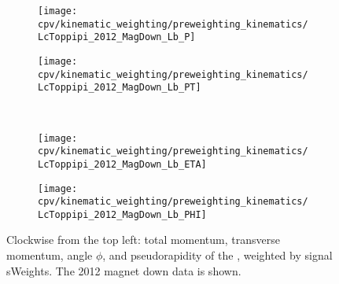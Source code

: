 \begin{sidewaystable}
  \centering
  \caption{%
    Statistics computed on the weighted \ppipi\ data for all data sub-samples 
    used in the analysis.
    The quantities are defined in \cref{chap:cpv:kinematic_weighting:stats}.
  }
  \label{tab:cpv:kinematic_weighting:validation:stats}
  
\end{sidewaystable}

\clearpage

\begin{figure}
  \begin{subfigure}[b]{0.4\textwidth}
    \texttt{[image: cpv/kinematic\_weighting/preweighting\_kinematics/LcToppipi\_2012\_MagDown\_Lb\_P]}
    \label{fig:cpv:kinematic_weighting:pre:Lb:P}
  \end{subfigure}
  \begin{subfigure}[b]{0.4\textwidth}
    \texttt{[image: cpv/kinematic\_weighting/preweighting\_kinematics/LcToppipi\_2012\_MagDown\_Lb\_PT]}
    \label{fig:cpv:kinematic_weighting:pre:Lb:PT}
  \end{subfigure}\\
  \begin{subfigure}[b]{0.4\textwidth}
    \texttt{[image: cpv/kinematic\_weighting/preweighting\_kinematics/LcToppipi\_2012\_MagDown\_Lb\_ETA]}
    \label{fig:cpv:kinematic_weighting:pre:Lb:ETA}
  \end{subfigure}
  \begin{subfigure}[b]{0.4\textwidth}
    \texttt{[image: cpv/kinematic\_weighting/preweighting\_kinematics/LcToppipi\_2012\_MagDown\_Lb\_PHI]}
    \label{fig:cpv:kinematic_weighting:pre:Lb:PHI}
  \end{subfigure}
  \caption{%
    Clockwise from the top left: total momentum, transverse momentum, angle 
    $\phi$, and pseudorapidity of the \PLambdab, weighted by signal sWeights.
    The 2012 magnet down data is shown.
  }
  \label{fig:cpv:kinematic_weighting:pre:Lb}
\end{figure}

